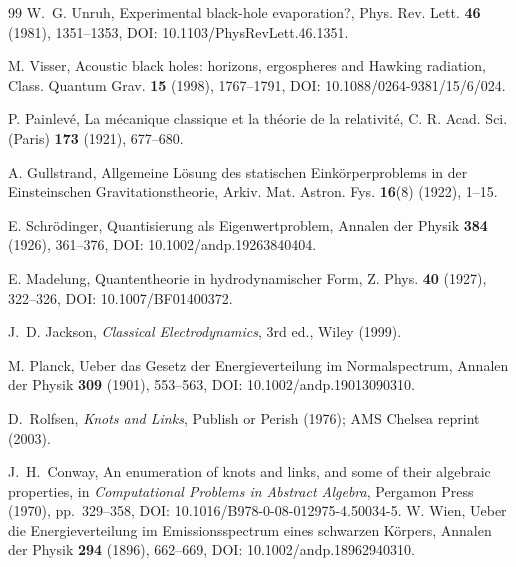 \documentclass[11pt]{article}
\theoremstyle{definition}
\theoremstyle{plain}
\theoremstyle{remark}
\begin{document}
\begin{thebibliography}{99}
            W.~G. Unruh,
            \newblock Experimental black-hole evaporation?,
            \newblock Phys. Rev. Lett. \textbf{46} (1981), 1351--1353,
            \newblock DOI: 10.1103/PhysRevLett.46.1351.

            M. Visser,
            \newblock Acoustic black holes: horizons, ergospheres and Hawking radiation,
            \newblock Class. Quantum Grav. \textbf{15} (1998), 1767--1791,
            \newblock DOI: 10.1088/0264-9381/15/6/024.

            P. Painlev\'e,
            \newblock La m\'ecanique classique et la th\'eorie de la relativit\'e,
            \newblock C. R. Acad. Sci. (Paris) \textbf{173} (1921), 677--680.

            A. Gullstrand,
            \newblock Allgemeine L\"osung des statischen Eink\"orperproblems in der Einsteinschen Gravitationstheorie,
            \newblock Arkiv. Mat. Astron. Fys. \textbf{16}(8) (1922), 1--15.

            E. Schr\"odinger,
            \newblock Quantisierung als Eigenwertproblem,
            \newblock Annalen der Physik \textbf{384} (1926), 361--376,
            \newblock DOI: 10.1002/andp.19263840404.

            E. Madelung,
            \newblock Quantentheorie in hydrodynamischer Form,
            \newblock Z. Phys. \textbf{40} (1927), 322--326,
            \newblock DOI: 10.1007/BF01400372.

            J.~D. Jackson,
            \newblock \emph{Classical Electrodynamics}, 3rd ed.,
            \newblock Wiley (1999).

            M. Planck,
            \newblock Ueber das Gesetz der Energieverteilung im Normalspectrum,
            \newblock Annalen der Physik \textbf{309} (1901), 553--563,
            \newblock DOI: 10.1002/andp.19013090310.


            D.~Rolfsen,
            \newblock \emph{Knots and Links},
            \newblock Publish or Perish (1976); AMS Chelsea reprint (2003).

            J.~H.~Conway,
            \newblock An enumeration of knots and links, and some of their algebraic properties,
            \newblock in \emph{Computational Problems in Abstract Algebra}, Pergamon Press (1970), pp.~329--358,
            \newblock DOI: 10.1016/B978-0-08-012975-4.50034-5.
            W. Wien,
            \newblock Ueber die Energieverteilung im Emissionsspectrum eines schwarzen K\"orpers,
            \newblock Annalen der Physik \textbf{294} (1896), 662--669,
            \newblock DOI: 10.1002/andp.18962940310.


\end{thebibliography}
\end{document}
